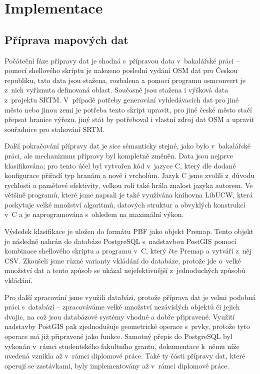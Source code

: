 \chapter{Implementace}
\label{ch:implementace}
\section{Příprava mapových dat}
\label{ch:implementace:OSM}
Počáteční fáze přípravy dat je shodná s~přípravou data v~bakalářské práci --
pomocí shellového skriptu je nalezeno poslední vydání OSM dat pro Českou
republiku, tato data jsou stažena, rozbalena a pomocí programu osmconvert je
z~nich vyříznuta definovaná oblast. Současně jsou stažena i výšková data
z~projektu SRTM. V~případě potřeby generování vyhledávacích dat pro jiné město
nebo jinou zemi je potřeba tento skript upravit, pro jiné české město stačí
přepsat hranice výřezu, jiný stát by potřeboval i vlastní zdroj dat OSM a
upravit souřadnice pro stahování SRTM. 

Další pokračování přípravy
dat je sice sémanticky stejné, jako bylo v~bakalářské práci, ale mechanizmus
přípravy byl kompletně změněn. Data jsou nejprve klasifikována; pro tento účel
byl vytvořen kód v~jazyce C, který dle dodané konfigurace přiřadí typ hranám a
nově i vrcholům. Jazyk C jsme zvolili z~důvodu rychlosti a paměťové efektivity,
velkou roli také hrála znalost jazyka autorem. Ve většině programů, které jsme
napsali je také využívána knihovna LibUCW\cite{LibUCW}, která poskytuje velké
množství algoritmů, datových struktur a obvyklých konstrukcí v~C a je
naprogramována s~ohledem na maximální výkon.

Výsledek klasifikace je uložen do formátu PBF jako objekt Premap. Tento objekt
je následně nahrán do databáze PostgreSQL s~nadstavbou PostGIS pomocí kombinace
shellového skriptu a programu v~C, který čte Premap a vytváří z~něj CSV.
Zkoušeli jsme různé varianty vkládání do databáze, protože jde o~velké množství
dat a tento způsob se ukázal nejefektivnější z~jednoduchých způsobů vkládání. 

Pro další zpracování jsme využili databázi, protože příprava dat je velmi
podobná práci s~databází -- zpracováváme velké množství nezávislých objektů či
jejich dvojic, na což jsou databázové systémy vhodné a dobře připravené. Využití
nadstavby PostGIS pak zjednodušuje geometrické operace s~prvky, protože tyto
operace má již připravené jako funkce. Samotný přepis do PostgreSQL byl vykonán
v~rámci studentského fakultního grantu, dokumentace k~němu níže uvedená vznikla
až v~rámci diplomové práce. Také ty části přípravy dat, které operují se
zastávkami, byly implementovány až v~rámci diplomové práce.

